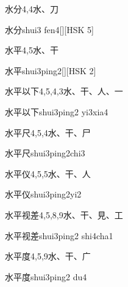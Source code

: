 \begin{entry}{水分}{4,4}{⽔、⼑}
  \begin{phonetics}{水分}{shui3 fen4}[][HSK 5]
  \end{phonetics}
\end{entry}

\begin{entry}{水平}{4,5}{⽔、⼲}
  \begin{phonetics}{水平}{shui3ping2}[][HSK 2]
  \end{phonetics}
\end{entry}

\begin{entry}{水平以下}{4,5,4,3}{⽔、⼲、⼈、⼀}
  \begin{phonetics}{水平以下}{shui3ping2 yi3xia4}
  \end{phonetics}
\end{entry}

\begin{entry}{水平尺}{4,5,4}{⽔、⼲、⼫}
  \begin{phonetics}{水平尺}{shui3ping2chi3}
  \end{phonetics}
\end{entry}

\begin{entry}{水平仪}{4,5,5}{⽔、⼲、⼈}
  \begin{phonetics}{水平仪}{shui3ping2yi2}
  \end{phonetics}
\end{entry}

\begin{entry}{水平视差}{4,5,8,9}{⽔、⼲、⾒、⼯}
  \begin{phonetics}{水平视差}{shui3ping2 shi4cha1}
  \end{phonetics}
\end{entry}

\begin{entry}{水平度}{4,5,9}{⽔、⼲、⼴}
  \begin{phonetics}{水平度}{shui3ping2 du4}
  \end{phonetics}
\end{entry}

